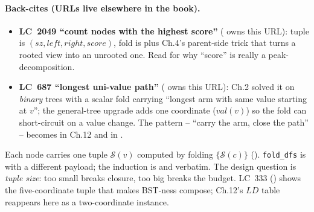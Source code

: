 \paragraph{Back-cites (URLs live elsewhere in the book).}
\begin{itemize}[nosep,leftmargin=1.4em]
  \item \textbf{LC~2049 ``count nodes with the highest score''} (
        owns this URL): tuple is $(\mathit{sz},\mathit{left},\mathit{right},
        \mathit{score})$, fold is  plus Ch.4's parent-side
        trick that turns a rooted view into an unrooted one. Read
         for why ``score'' is really a peak-decomposition.
  \item \textbf{LC~687 ``longest uni-value path''} ( owns this
        URL): Ch.2 solved it on \emph{binary} trees with a scalar fold
        carrying ``longest arm with same value starting at $v$''; the
        general-tree upgrade adds one coordinate ($\mathit{val}(v)$) so
        the fold can short-circuit on a value change. The pattern --
        ``carry the arm, close the path'' -- becomes 
        in Ch.12 and  in .
\end{itemize}

\begin{recallbox}
Each node carries one tuple $\mathcal S(v)$ computed by folding
$\{\mathcal S(c)\}$ (). \lstinline{fold_dfs} is
 with a different payload; the induction is
 and  verbatim.
The design question is \emph{tuple size}: too small breaks closure, too big
breaks the budget. LC~333 () shows the
five-coordinate tuple that makes BST-ness compose; Ch.12's
$\mathit{LD}$ table reappears here as a two-coordinate instance.
\end{recallbox}
